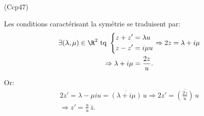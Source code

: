 \begin{tiny}(Ccp47)\end{tiny} Les conditions caractérisant la symétrie se traduisent par:
\begin{multline*}
  \exists (\lambda, \mu)\in \R^2 \text{ tq } 
  \left\lbrace 
  \begin{aligned}
    z + z' &= \lambda u \\
    z - z' &= i \mu u
  \end{aligned}
\right. 
\Rightarrow
2z = \lambda + i \mu \\
\Rightarrow \lambda + i \mu = \frac{2z}{u}.
\end{multline*}

Or:
\begin{multline*}
  2z' = \lambda - \mu i u = \overline{(\lambda + i \mu)}\, u
  \Rightarrow 2z' = \overline{\left( \frac{2z}{u}\right) }\, u\\
  \Rightarrow z' = \frac{u}{\overline{u}}\, \overline{z}.
\end{multline*}
